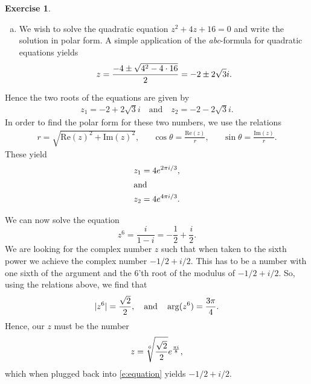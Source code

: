 \documentclass[10pt]{amsart}
\newcommand{\Rez}[1]{\mathrm{Re}(#1)}
\newcommand{\Imz}[1]{\mathrm{Im}(#1)}
\theoremstyle{definition}
\newtheorem{exercise}{Exercise}
\begin{document}
\begin{exercise}\hfill
  \begin{enumerate}[a)]
    \item We wish to solve the quadratic equation $z^2 + 4z + 16 = 0$ and write the solution in polar form.
      A simple application of the \emph{abc}-formula for quadratic equations yields
      \begin{equation}
        \notag
        z = \frac{-4 \pm \sqrt{4^2 - 4\cdot 16}}{2} = -2 \pm 2\sqrt{3}i.
      \end{equation}
  \end{enumerate} 
  Hence the two roots of the equations are given by
  \begin{align*}
    z_1 = -2 + 2\sqrt{3}i \quad \text{and} \quad z_2 = -2 - 2\sqrt{3}i.
  \end{align*}
  In order to find the polar form for these two numbers, we use the relations
  \begin{align*}
    r = \sqrt{\Rez{z}^2 + \Imz{z}^2}, && \cos\theta = \frac{\Rez{z}}{r}, && \sin\theta = \frac{\Imz{z}}{r}.
  \end{align*}
  These yield
  \begin{align*}
    z_1 = 4e^{2\pi i /3}, \\
    \intertext{and}
    z_2 = 4e^{4\pi i/ 3}.
  \end{align*}
  \item We can now solve the equation
    \begin{equation}
      \label{e:equation} 
      z^6 = \frac{i}{1-i} = -\frac{1}{2} + \frac{i}{2}.
    \end{equation}
    We are looking for the complex number $z$ such that when taken to the sixth
    power we achieve the complex number $-1/2 + i/2$. This has to be a number
    with one sixth of the argument and the 6'th root of the modulus of $-1/2 +
    i/2$.
    So, using the relations above, we find that
    \begin{equation}
      \notag
      |z^6| = \frac{\sqrt{2}}{2}, \quad \text{and} \quad \arg(z^6) = \frac{3\pi}{4}.
    \end{equation}
    Hence, our $z$ must be the number
    \begin{equation}
      \notag
      z = \sqrt[6]{\frac{\sqrt{2}}{2}}e^{\frac{\pi i}{8}}, 
    \end{equation}
    which when plugged back into \cref{e:equation} yields $-1/2 + i/2$.
\end{exercise}
\end{document}
